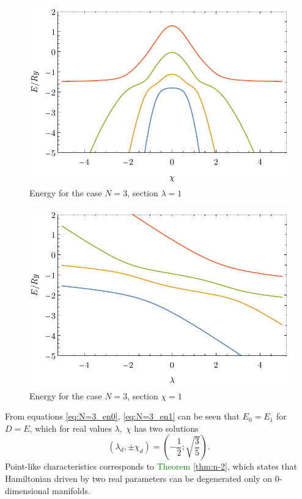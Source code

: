 \begin{figure}[H]
    \centering
    \includegraphics{../img/N=3_energiesl.pdf}
    \caption{Energy for the case $N=3$, section $\lambda=1$}
    \label{fig:N=3_energiesl}
\end{figure}
\begin{figure}[H]
    \centering
    \includegraphics{../img/N=3_energiesc.pdf}
    \caption{Energy for the case $N=3$, section $\chi=1$}
    \label{fig:N=3_energiesc}
\end{figure}

From equations \ref{eq:N=3_en0}, \ref{eq:N=3_en1} can be seen that $E_0=E_1$ for $D=E$, which for real values $\lambda,\;\chi$ has two solutions
$$(\lambda_d,\pm \chi_d)=\left(-\frac{1}{2};\sqrt{\frac{3}{5}}\right).$$
Point-like characteristics corresponds to \textcolor{green}{Theorem} \ref{thm:n-2}, which states that Hamiltonian driven by two real parameters can be degenerated only on 0-dimensional manifolds. 

